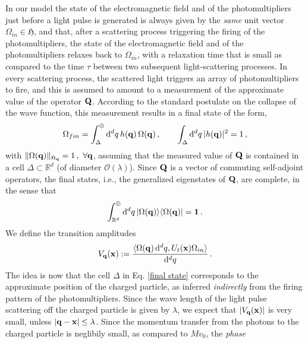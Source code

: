 \documentclass[11pt]{article}
\renewcommand{\d}{{\mathrm d}}
\begin{document}
In our model the state of the electromagnetic field and of the photomultipliers just before a light pulse is generated is 
always given by the \textit{same} unit vector $\Omega_{in} \in \mathfrak{H}$, and that, after a scattering process triggering the 
firing of the photomultipliers, the state of the electromagnetic field and of the photomultipliers relaxes back to $\Omega_{in}$, 
with a relaxation time that is small as compared to the time $\tau$ between two subsequent light-scattering processes. 
In every scattering process, the scattered light triggers an array of photomultipliers to fire, and this is assumed to amount 
to a measurement of the approximate value of the operator ${\bf{Q}}$. 
According to the standard postulate on the collapse of the wave function, this measurement results in a final state of the form, 
 \begin{equation}\label{final state}
 \Omega_{fin} = \int_{\Delta}^{\oplus} \d^{d}{q} \, h(\mathbf{q})\, \Omega({\bf{q}})\,,  \qquad \int_{\Delta} \d^{d}q\,\vert h(\mathbf{q})\vert^{2} =1\,,
 \end{equation}
with $ \Vert \Omega({\bf{q}}) \Vert_{\mathfrak{H}_{{\bf{q}}}} = 1\,, \,\,\forall {\bf{q}}$, assuming that the measured 
value of ${\bf{Q}}$ is contained in a cell $\Delta \subset \mathbb{R}^{d}$ (of diameter 
$\mathcal{O}(\lambda)$). Since ${\bf{Q}}$ is a vector of commuting self-adjoint operators, the final states, i.e., 
the generalized eigenstates of ${\bf{Q}}$, are complete, in the sense that
\begin{equation}\label{completeness-1}
\int_{\mathbb{R}^{d}}^{\oplus} \d^{d}q\, \vert \Omega({\bf{q}})\rangle \langle\Omega({\bf{q}})\vert  = {\bf{1}}\,.
\end{equation}
We define the transition amplitudes
\begin{equation}\label{trans ampl}
 V_{\bf{q}} (\mathbf{x}):= \frac{\langle \Omega({\bf{q}})\,\d^{d}{q}, U_{t}({\bf{x}}) \Omega_{in}\rangle}{\d^{d}{q}} \,.
 \end{equation}
The idea is now that the cell $\Delta$ in Eq. \eqref{final state} corresponds to the approximate position of the charged particle, as inferred \textit{indirectly} from the firing pattern of the photomultipliers. Since the wave length of the light pulse scattering off the charged particle is given by 
$\lambda$, we expect that $\vert V_{\bf{q}} ({\bf{x}}) \vert$ is very small, unless $\vert {\bf{q}}-{\bf{x}} \vert \leq \lambda$. Since the momentum transfer from the photons to the charged particle is neglibily small, as compared to $Mv_0$, the \textit{phase} 
\end{document}
